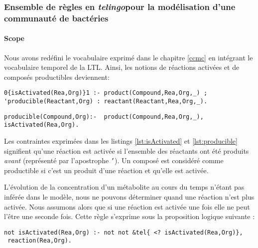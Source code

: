 \documentclass[../main.tex]{subfiles}
\begin{document}
\subsubsection*{Ensemble de règles en \textit{telingo}pour la modélisation d'une communauté de bactéries}

\paragraph*{Scope}
Nous avons redéfini le vocabulaire exprimé dans le chapitre \ref{ccmc} en intégrant le vocabulaire temporel de la LTL. Ainsi, les notions de réactions activées et de composés productibles deviennent:

\begin{lstlisting}[label = lst:isActivated, caption = Règle d'activation d'une réaction, captionpos=b ]
0{isActivated(Rea,Org)}1 :- product(Compound,Rea,Org,_) ;
'producible(Reactant,Org) : reactant(Reactant,Rea,Org,_).
\end{lstlisting}

\begin{lstlisting}[label=lst:productible, caption = Règle de productibilité d'un composé, captionpos=b]
producible(Compound,Org):-  product(Compound,Rea,Org,_),
isActivated(Rea,Org).
\end{lstlisting}

Les contraintes exprimées dans les listings \ref{lst:isActivated} et \ref{lst:producible} signifient qu'une réaction est activée si l'ensemble des réactants ont été produits \textit{avant} (représenté par l'apostrophe \texttt{'}). Un composé est considéré comme productible si c'est un produit d'une réaction et qu'elle est activée.

L'évolution de la concentration d'un métabolite au cours du temps n'étant pas inférée dans le modèle, nous ne pouvons déterminer quand une réaction n'est plus activée. Nous assumons alors que si une réaction est activée une fois elle ne peut l'être une seconde fois. Cette règle s'exprime sous la proposition logique suivante :

\begin{lstlisting}[label=lst:notactivated, caption = Règle interdisant qu'une réaction soit activée deux fois, captionpos=b]
not isActivated(Rea,Org) :- not not &tel{ <? isActivated(Rea,Org)},
 reaction(Rea,Org).
\end{lstlisting}

\end{document}
